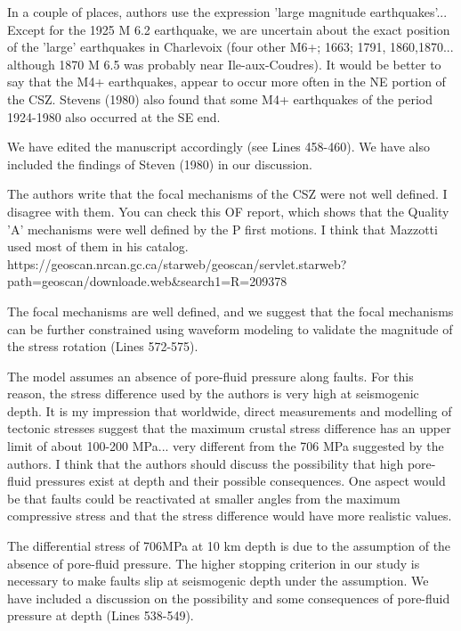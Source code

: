 \documentclass[12pt]{article}
\begin{document}
\begin{response}{In a couple of places, authors use the expression 'large magnitude earthquakes'... Except for the 1925 M 6.2 earthquake, we are uncertain about the exact position of the 'large' earthquakes in Charlevoix (four other M6+; 1663; 1791, 1860,1870... although 1870 M 6.5 was probably near Ile-aux-Coudres). It would be better to say that the M4+ earthquakes, appear to occur more often in the NE portion of the CSZ. Stevens (1980) also found that some M4+ earthquakes of the period 1924-1980 also occurred at the SE end.}

  We have edited the manuscript accordingly (see Lines 458-460). We have also included the findings of Steven (1980) in our discussion.
\end{response}

\begin{response}{The authors write that the focal mechanisms of the CSZ were not well defined. I disagree with them. You can check this OF report, which shows that the Quality 'A' mechanisms were well defined by the P first motions. I think that Mazzotti used most of them in his catalog.
https://geoscan.nrcan.gc.ca/starweb/geoscan/servlet.starweb?
path=geoscan/downloade.web\&search1=R=209378}

 The focal mechanisms are well defined, and we suggest that the focal mechanisms can be further constrained using waveform modeling to validate the magnitude of the stress rotation (Lines 572-575).
\end{response}

\begin{response}{The model assumes an absence of pore-fluid pressure along faults. For this reason, the stress difference used by the authors is very high at seismogenic depth. It is my impression that worldwide, direct measurements and modelling of tectonic stresses suggest that the maximum crustal stress difference has an upper limit of about 100-200 MPa... very different from the 706 MPa suggested by the authors.
I think that the authors should discuss the possibility that high pore-fluid pressures exist at depth and their possible consequences. One aspect would be that faults could be reactivated at smaller angles from the maximum compressive stress and that the stress difference would have more realistic values.}

  The differential stress of 706MPa at 10 km depth is due to the assumption of the absence of pore-fluid pressure. The higher stopping criterion in our study is necessary to make faults slip at seismogenic depth under the assumption. We have included a discussion on the possibility and some consequences of pore-fluid pressure at depth (Lines 538-549).
\end{response}
\end{document}
